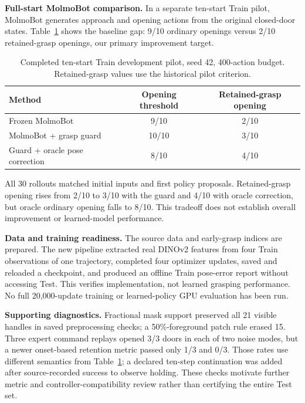 \documentclass{article}
\begin{document}
\textbf{Full-start MolmoBot comparison.} In a separate ten-start Train pilot,
MolmoBot generates approach and opening actions from the original closed-door
states. Table~\ref{tab:oracle} shows the baseline gap: 9/10 ordinary openings
versus 2/10 retained-grasp openings, our primary improvement target.

\begin{table}[!ht]
\centering
\caption{Completed ten-start Train development pilot, seed 42, 400-action budget.
Retained-grasp values use the historical pilot criterion.}
\label{tab:oracle}
\begin{tabular}{lcc}
\toprule
Method & Opening threshold & Retained-grasp opening\\
\midrule
Frozen MolmoBot & 9/10 & 2/10\\
MolmoBot + grasp guard & 10/10 & 3/10\\
Guard + oracle pose correction & 8/10 & 4/10\\
\bottomrule
\end{tabular}
\end{table}

All 30 rollouts matched initial inputs and first policy proposals. Retained-grasp
opening rises from 2/10 to 3/10 with the guard and 4/10 with oracle correction,
but oracle ordinary opening falls to 8/10. This tradeoff does not establish
overall improvement or learned-model performance.

\begin{samepage}
\textbf{Data and training readiness.} The source data and early-grasp indices
are prepared. The new pipeline extracted real DINOv2 features from four Train observations of one
trajectory, completed four optimizer updates, saved and reloaded a checkpoint,
and produced an offline Train pose-error report without accessing Test.
This verifies implementation, not learned grasping performance. No full
20,000-update training or learned-policy GPU evaluation has been run.\par
\end{samepage}

\textbf{Supporting diagnostics.} Fractional mask support preserved all 21
visible handles in saved preprocessing checks; a 50\%-foreground patch rule
erased 15. Three expert command replays opened 3/3 doors in each of two noise
modes, but a newer onset-based retention metric passed only 1/3 and 0/3.
Those rates use different semantics from Table~\ref{tab:oracle}; a declared
ten-step continuation was added after source-recorded success to observe
holding. These checks motivate further metric and controller-compatibility
review rather than certifying the entire Test set.
\end{document}
